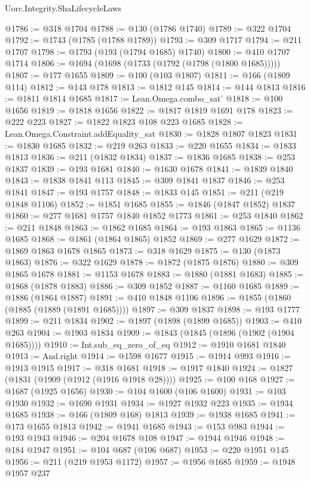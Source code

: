 \begin{lexlean}{Uorc.Integrity.ShaLifecycleLaws}
\begin{coremodule}
@1786 := @318 @1704
@1788 := @130 (@1786 @1740)
@1789 := @322 @1704
@1792 := @1743 (@1785 (@1788 @1789))
@1793 := @309 @1717
@1794 := @211 @1707
@1798 := @1793 (@193 (@1794 @1685) @1740)
@1800 := @410 @1707 @1714
@1806 := @1694 (@1698 (@1733 (@1792 (@1798 (@1800 @1685)))))
@1807 := @177 @1655
@1809 := @100 (@103 @1807)
@1811 := @166 (@1809 @114)
@1812 := @143 @178
@1813 := @1812 @145
@1814 := @144 @1813
@1816 := @1811 @1814 @1685
@1817 := Lean.Omega.combo_sat'
@1818 := @100 @1656
@1819 := @1818 @1656
@1822 := @1817 @1819 @1691 @178
@1823 := @222 @223
@1827 := @1822 @1823 @108 @223 @1685
@1828 := Lean.Omega.Constraint.addEquality_sat
@1830 := @1828 @1807 @1823
@1831 := @1830 @1685
@1832 := @219 @263
@1833 := @220 @1655
@1834 := @1833 @1813
@1836 := @211 (@1832 @1834)
@1837 := @1836 @1685
@1838 := @253 @1837
@1839 := @193 @1681
@1840 := @1630 @1678
@1841 := @1839 @1840
@1843 := @1838 @1841 @113
@1845 := @309 @1841 @1837
@1846 := @253 @1841
@1847 := @193 @1757
@1848 := @1833 @145
@1851 := @211 (@219 @1848 @1106)
@1852 := @1851 @1685
@1855 := @1846 (@1847 @1852) @1837
@1860 := @277 @1681 @1757 @1840 @1852 @1773
@1861 := @253 @1840
@1862 := @211 @1848
@1863 := @1862 @1685
@1864 := @193 @1863
@1865 := @1136 @1685
@1868 := @1861 (@1864 @1865) @1852
@1869 := @277 @1629
@1872 := @1869 @1863 @1678 @1865
@1873 := @318 @1629
@1875 := @130 (@1873 @1863)
@1876 := @322 @1629
@1878 := @1872 (@1875 @1876)
@1880 := @309 @1865 @1678
@1881 := @1153 @1678
@1883 := @1880 (@1881 @1683)
@1885 := @1868 (@1878 @1883)
@1886 := @309 @1852
@1887 := @1160 @1685
@1889 := @1886 (@1864 @1887)
@1891 := @410 @1848 @1106
@1896 := @1855 (@1860 (@1885 (@1889 (@1891 @1685))))
@1897 := @309 @1837
@1898 := @193 @1777
@1899 := @211 @1834
@1902 := @1897 (@1898 (@1899 @1685))
@1903 := @410 @263
@1904 := @1903 @1834
@1909 := @1843 (@1845 (@1896 (@1902 (@1904 @1685))))
@1910 := Int.sub_eq_zero_of_eq
@1912 := @1910 @1681 @1840
@1913 := And.right
@1914 := @1598 @1677
@1915 := @1914 @993
@1916 := @1913 @1915
@1917 := @318 @1681
@1918 := @1917 @1840
@1924 := @1827 (@1831 (@1909 (@1912 (@1916 @1918 @28))))
@1925 := @100 @168
@1927 := @1687 (@1925 @1656)
@1930 := @104 @1600 (@106 @1600)
@1931 := @103 @1930
@1932 := @1690 @1931
@1934 := @1927 @1932 @223
@1935 := @1934 @1685
@1938 := @166 (@1809 @168) @1813
@1939 := @1938 @1685
@1941 := @173 @1655 @1813
@1942 := @1941 @1685
@1943 := @153 @983
@1944 := @193 @1943
@1946 := @204 @1678 @108
@1947 := @1944 @1946
@1948 := @184 @1947
@1951 := @104 @687 (@106 @687)
@1953 := @220 @1951 @145
@1956 := @211 (@219 @1953 @1172)
@1957 := @1956 @1685
@1959 := @1948 @1957 @237

\end{coremodule}
\end{lexlean}
